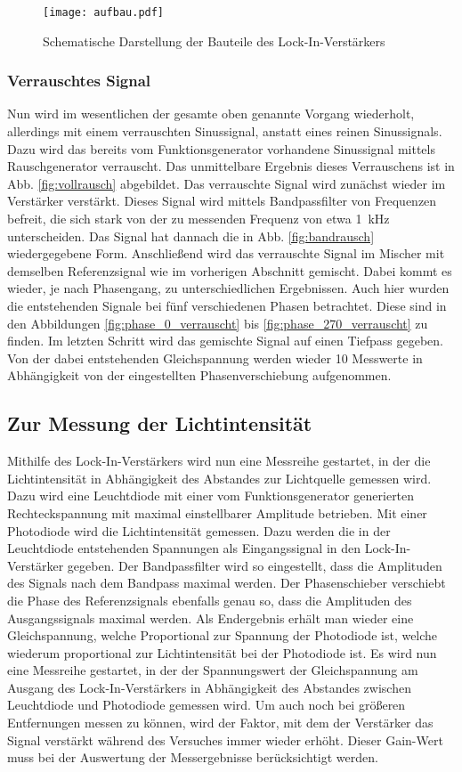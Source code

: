 \begin{figure}
\centering
\label{fig:aufbau}
\texttt{[image: aufbau.pdf]}
\caption{Schematische Darstellung der Bauteile des Lock-In-Verstärkers}
\end{figure}

\subsubsection{Verrauschtes Signal}
Nun wird im wesentlichen der gesamte oben genannte Vorgang wiederholt, allerdings mit einem verrauschten Sinussignal, anstatt eines reinen Sinussignals. Dazu wird das bereits vom Funktionsgenerator vorhandene Sinussignal mittels Rauschgenerator verrauscht. Das unmittelbare Ergebnis dieses Verrauschens ist in Abb. \ref{fig:vollrausch} abgebildet. Das verrauschte Signal wird zunächst wieder im Verstärker verstärkt. Dieses Signal wird mittels Bandpassfilter von Frequenzen befreit, die sich stark von der zu messenden Frequenz von etwa \SI{1}{\kilo\hertz} unterscheiden. Das Signal hat dannach die in Abb. \ref{fig:bandrausch} wiedergegebene Form. Anschließend wird das verrauschte Signal im Mischer mit demselben Referenzsignal wie im vorherigen Abschnitt gemischt. Dabei kommt es wieder, je nach Phasengang, zu unterschiedlichen Ergebnissen. Auch hier wurden die entstehenden Signale bei fünf verschiedenen Phasen betrachtet. Diese sind in den Abbildungen \ref{fig:phase_0_verrauscht} bis \ref{fig:phase_270_verrauscht} zu finden.
Im letzten Schritt wird das gemischte Signal auf einen Tiefpass gegeben. Von der dabei entstehenden Gleichspannung werden wieder 10 Messwerte in Abhängigkeit von der eingestellten Phasenverschiebung aufgenommen.

\subsection{Zur Messung der Lichtintensität}
Mithilfe des Lock-In-Verstärkers wird nun eine Messreihe gestartet, in der die Lichtintensität in Abhängigkeit des Abstandes zur Lichtquelle gemessen wird. Dazu wird eine Leuchtdiode mit einer vom Funktionsgenerator generierten Rechteckspannung mit maximal einstellbarer Amplitude betrieben. Mit einer Photodiode wird die Lichtintensität gemessen. Dazu werden die in der Leuchtdiode entstehenden Spannungen als Eingangssignal in den Lock-In-Verstärker gegeben. Der Bandpassfilter wird so eingestellt, dass die Amplituden des Signals nach dem Bandpass maximal werden. Der Phasenschieber verschiebt die Phase des Referenzsignals ebenfalls genau so, dass die Amplituden des Ausgangssignals maximal werden. Als Endergebnis erhält man wieder eine Gleichspannung, welche Proportional zur Spannung der Photodiode ist, welche wiederum proportional zur Lichtintensität bei der Photodiode ist. Es wird nun eine Messreihe gestartet, in der der Spannungswert der Gleichspannung am Ausgang des Lock-In-Verstärkers in Abhängigkeit des Abstandes zwischen Leuchtdiode und Photodiode gemessen wird. Um auch noch bei größeren Entfernungen messen zu können, wird der Faktor, mit dem der Verstärker das Signal verstärkt während des Versuches immer wieder erhöht. Dieser Gain-Wert muss bei der Auswertung der Messergebnisse berücksichtigt werden.